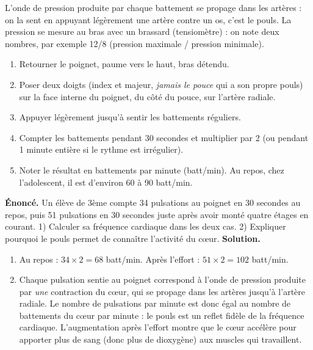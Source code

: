 \documentclass[11pt]{article}
\newcommand{\cle}[1]{{\popxbold\color{popdark}#1}}
\begin{document}
L'onde de pression produite par chaque battement se propage dans les artères : on la sent en appuyant légèrement une artère contre un os, c'est le \cle{pouls}. La pression se mesure au bras avec un brassard (tensiomètre) : on note deux nombres, par exemple 12/8 (pression maximale / pression minimale).

\begin{methode}
\begin{enumerate}
\item Retourner le poignet, paume vers le haut, bras détendu.
\item Poser deux doigts (index et majeur, \emph{jamais le pouce} qui a son propre pouls) sur la face interne du poignet, du côté du pouce, sur l'artère radiale.
\item Appuyer légèrement jusqu'à sentir les battements réguliers.
\item Compter les battements pendant 30 secondes et multiplier par 2 (ou pendant 1 minute entière si le rythme est irrégulier).
\item Noter le résultat en battements par minute (batt/min). Au repos, chez l'adolescent, il est d'environ 60 à 90 batt/min.
\end{enumerate}
\end{methode}

\begin{exoresolu}
\textbf{Énoncé.} Un élève de 3ème compte 34 pulsations au poignet en 30 secondes au repos, puis 51 pulsations en 30 secondes juste après avoir monté quatre étages en courant. 1) Calculer sa fréquence cardiaque dans les deux cas. 2) Expliquer pourquoi le pouls permet de connaître l'activité du cœur.
\tcblower
\textbf{Solution.}
\begin{enumerate}
\item Au repos : $34 \times 2 = 68$ batt/min. Après l'effort : $51 \times 2 = 102$ batt/min.
\item Chaque pulsation sentie au poignet correspond à l'onde de pression produite par \emph{une} contraction du cœur, qui se propage dans les artères jusqu'à l'artère radiale. Le nombre de pulsations par minute est donc égal au nombre de battements du cœur par minute : le pouls est un reflet fidèle de la fréquence cardiaque. L'augmentation après l'effort montre que le cœur accélère pour apporter plus de sang (donc plus de dioxygène) aux muscles qui travaillent.
\end{enumerate}
\end{exoresolu}
\end{document}
